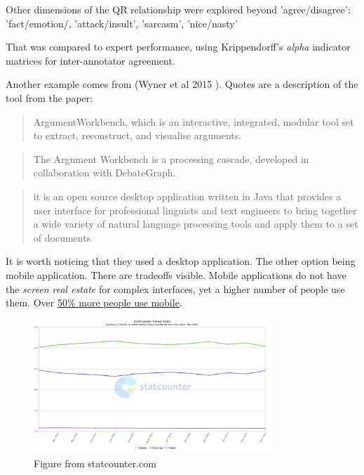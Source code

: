 \documentclass{report}
\begin{document}
Other dimensions of the QR relationship were explored beyond 'agree/disagree': 'fact/emotion/, 'attack/insult', 'sarcasm', 'nice/nasty'

That was compared to expert performance, using Krippendorff's \textit{alpha} indicator matrices for inter-annotator agreement.

Another example comes from (Wyner et al 2015 ).  Quotes are a description of the tool from the paper:
\begin{quote}
 ArgumentWorkbench, which is an interactive, integrated, modular tool set to extract, reconstruct, and visualise arguments. 
\end{quote} 
\cite[page 78]{wyner_argument_2015}
\begin{quote}
 The Argument Workbench is a processing cascade, developed in collaboration with DebateGraph. 
\end{quote}
\cite[page 78]{wyner_argument_2015}
\begin{quote}
 it is an open source desktop application written in Java that provides a user interface for professional linguists and text engineers to bring together a wide variety of natural language processing tools and apply them to a set of documents
\end{quote}
\cite[page 79]{wyner_argument_2015}

It is worth noticing that they used a desktop application. The other option being mobile application. There are tradeoffs visible.
Mobile applications do not have the \textit{screen real estate} for complex interfaces, yet a higher number of people use them. Over \href{https:\\gs.statcounter.com/platform-market-share/desktop-mobile-tablet}{50\% more people use mobile}.

\begin{figure}[h]
    \centering
    \includegraphics[width=0.8\textwidth]{./images/StatCounter-comparison-ww-monthly-202203-202303.png}
    \caption{Figure from statcounter.com}
\end{figure}
\end{document}
